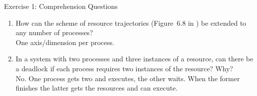 \documentclass[10pt]{beamer}
\begin{document}
\begin{frame}[allowframebreaks]{Exercise 1: Comprehension Questions}
\begin{enumerate}
                \item How can the scheme of resource trajectories (Figure~6.8 in \autocite{tanenbaum}) be extended to any number of processes? \\
                    \alert{One axis/dimension per process.}

                \item In a system with two processes and three instances of a resource, can there be a deadlock if each process requires two instances of the resource? Why? \\
                    \alert{No. One process gets two and executes, the other waits. When the former finishes the latter gets the resources and can execute.}
            \end{enumerate}
        \end{frame}
\end{document}
